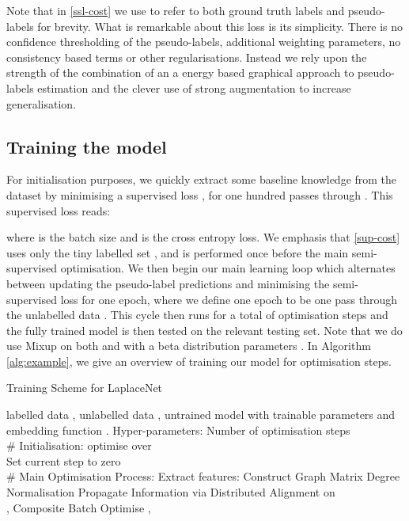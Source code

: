 \documentclass[journal]{IEEEtran}
\begin{document}
Note that in \eqref{ssl-cost} we use  to refer to both ground truth labels and pseudo-labels for brevity. What is remarkable about this loss is its simplicity. There is no confidence thresholding of the pseudo-labels, additional weighting parameters, no consistency based terms or other regularisations.  Instead we rely upon the strength of the combination of an a energy based graphical approach to pseudo-labels estimation and the clever use of strong augmentation to increase generalisation. 


\subsection{Training the model}

For initialisation purposes, we quickly extract some baseline knowledge from the dataset by minimising a supervised loss , for one hundred passes through . This supervised loss reads:


where  is the batch size and  is the cross entropy loss. We emphasis that \eqref{sup-cost} uses only the tiny labelled set , and is performed once before the main semi-supervised optimisation. We then begin our main learning loop which alternates between updating the pseudo-label predictions and minimising the semi-supervised loss  for one epoch, where we define one epoch to be one pass through the unlabelled data . This cycle then runs for a total of  optimisation steps and the fully trained model is then tested on the relevant testing set. Note that we do use Mixup \cite{zhang2017mixup} on both  and  with a beta distribution parameters . In Algorithm \ref{alg:example}, we give an overview of training our model for  optimisation steps.



\begin{algorithm}[t!]
\caption{Training Scheme for LaplaceNet}
\label{alg:example}
\begin{algorithmic}[1]
    labelled data , unlabelled data , untrained model  with trainable parameters  and embedding function . Hyper-parameters: Number of optimisation steps  \\
   \textcolor{greenPython}{\# Initialisation:}
    \STATE optimise  over 
   \ENDFOR \\
   \STATE Set current step to zero  \\
   \textcolor{greenPython}{\# Main Optimisation Process:}
   \WHILE{}
   \STATE Extract features: 
   \STATE Construct Graph Matrix 
   \STATE Degree Normalisation 
   \STATE Propagate Information via 
   \STATE Distributed Alignment on 
   \STATE   \\
        \STATE  , 
        \STATE Composite Batch 
        \STATE Optimise  ,  
   \ENDFOR 
   \ENDWHILE
\end{algorithmic}
\end{algorithm}
\end{document}

